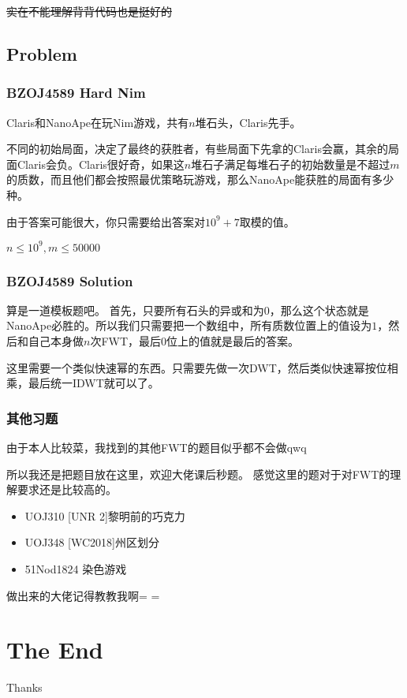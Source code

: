 \documentclass[10pt]{beamer}
\begin{document}
\begin{spacing}{1.2}
\begin{frame}
			\sout{实在不能理解背背代码也是挺好的}
		\end{frame}
		\subsection{Problem}
		\begin{frame}
			\frametitle{BZOJ4589 Hard Nim}

			Claris和NanoApe在玩Nim游戏，共有$n$堆石头，Claris先手。 \pause

			不同的初始局面，决定了最终的获胜者，有些局面下先拿的Claris会赢，其余的局面Claris会负。Claris很好奇，如果这$n$堆石子满足每堆石子的初始数量是不超过$m$的质数，而且他们都会按照最优策略玩游戏，那么NanoApe能获胜的局面有多少种。 \pause

			由于答案可能很大，你只需要给出答案对$10^9+7$取模的值。 \pause

			$n \le 10^9,m \le 50000$

		\end{frame}
		\begin{frame}
			\frametitle{BZOJ4589 Solution}

			算是一道模板题吧。 \pause 首先，只要所有石头的异或和为$0$，那么这个状态就是NanoApe必胜的。所以我们只需要把一个数组中，所有质数位置上的值设为$1$，然后和自己本身做$n$次FWT，最后$0$位上的值就是最后的答案。 \pause

			这里需要一个类似快速幂的东西。只需要先做一次DWT，然后类似快速幂按位相乘，最后统一IDWT就可以了。

		\end{frame}
		\begin{frame}
			\frametitle{其他习题}

			由于本人比较菜，我找到的其他FWT的题目似乎都不会做qwq \pause

			所以我还是把题目放在这里，欢迎大佬课后秒题。 \pause
			感觉这里的题对于对FWT的理解要求还是比较高的。 \pause

			\begin{itemize}
				\item UOJ310 [UNR 2]黎明前的巧克力
				\item UOJ348 [WC2018]州区划分
				\item 51Nod1824 染色游戏
			\end{itemize} \pause

			做出来的大佬记得教教我啊= =

		\end{frame}
		\section{The End}
		\begin{frame}
			\Huge{\centerline{Thanks}}
		\end{frame}

	\end{spacing}
\end{document}
